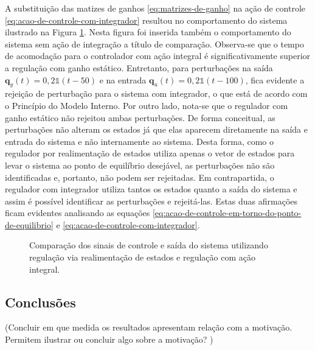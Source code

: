A substituição das matizes de ganhos \ref{eq:matrizes-de-ganho} na ação de
controle \ref{eq:acao-de-controle-com-integrador} resultou no comportamento do
sistema ilustrado na Figura \ref{fig:resultado-do-regulador-com-integrador}.
Nesta figura foi inserida também o comportamento do sistema sem ação de
integração a título de comparação. Observa-se que o tempo de acomodação para o
controlador com ação integral é significativamente superior a regulação com
ganho estático. Entretanto, para perturbações na saída $\mathbf{q}_{y}(t) =
0,2\mathbf{\mathds{1}}(t-50)$ e na entrada $\mathbf{q}_{u}(t) =
0,2\mathbf{\mathds{1}}(t-100)$, fica evidente a rejeição de perturbação para o
sistema com integrador, o que está de acordo com o Princípio do Modelo Interno.
Por outro lado, nota-se que o regulador com ganho estático não rejeitou ambas
perturbações. De forma conceitual, as perturbações não alteram os estados já que
elas aparecem diretamente na saída e entrada do sistema e não internamente ao
sistema. Desta forma, como o regulador por realimentação de estados utiliza
apenas o vetor de estados para levar o sistema ao ponto de equilíbrio desejável,
as perturbações não são identificadas e, portanto, não podem ser rejeitadas. Em
contrapartida, o regulador com integrador utiliza tantos os estados quanto a
saída do sistema e assim é possível identificar as perturbações e rejeitá-las.
Estas duas afirmações ficam evidentes analisando as equações
\ref{eq:acao-de-controle-em-torno-do-ponto-de-equilibrio} e
\ref{eq:acao-de-controle-com-integrador}. 

\begin{figure}[!htp]
    \caption{Comparação dos sinais de controle e saída do sistema utilizando
    regulação via realimentação de estados e regulação com ação integral.}
    \vspace{-10pt}
    \hspace{-30pt}
    \label{fig:resultado-do-regulador-com-integrador}
    \begin{minipage}{\linewidth}
        
    \end{minipage}
\end{figure}

\subsection{Conclusões}
(Concluir em que medida os resultados apresentam relação com a motivação.
Permitem ilustrar ou concluir algo sobre a motivação? )

